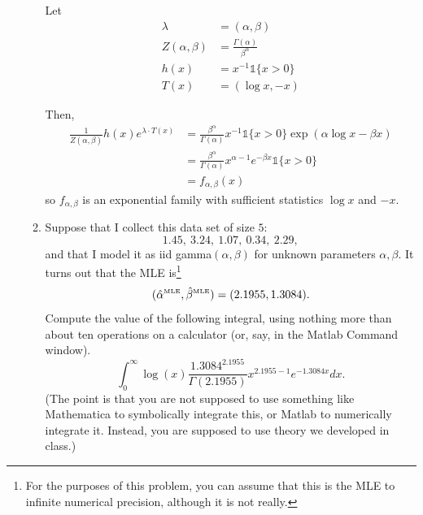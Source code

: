 \documentclass[11pt]{report}
\newcommand{\ind}{{\mathds{1}}}
\begin{document}
\begin{enumerate}[1.]
\begin{enumerate}
                    \color{blue}
                    Let
                    \begin{align*}
                        \lambda          & = (\alpha, \beta)                       \\
                        Z(\alpha, \beta) & = \frac{\Gamma(\alpha)}{\beta^{\alpha}} \\
                        h(x)             & = x^{-1}\ind\{x > 0\}                   \\
                        T(x)             & = (\log x, -x)
                    \end{align*}

                    Then,
                    \begin{align*}
                        \frac{1}{Z(\alpha, \beta)} h(x) e^{\lambda \cdot T(x)} & = \frac{\beta^\alpha}{\Gamma(\alpha)} x^{-1} \ind\{x > 0\} \exp\left(\alpha \log x - \beta x\right) \\
                                                                               & = \frac{\beta^\alpha}{\Gamma(\alpha)} x^{\alpha - 1} e^{-\beta x} \ind\{x > 0\}                     \\
                                                                               & = f_{\alpha, \beta}(x)
                    \end{align*}
                    so $f_{\alpha, \beta}$ is an exponential family with sufficient statistics $\log x$ and $-x$.
                    \color{black}

              \item Suppose that I collect this data set of size $5$:
                    \[ 1.45, \ 3.24, \ 1.07, \ 0.34, \ 2.29,  \]
                    and that I model it as iid gamma$(\alpha,\beta)$ for unknown parameters $\alpha,\beta$. It turns out that the MLE is\footnote{For the purposes of this problem, you can assume that this is the MLE to infinite numerical precision, although it is not really.}
                    \[ (\hat\alpha^\text{\tiny MLE},\hat\beta^\text{\tiny MLE})=(2.1955,1.3084) . \]
                    Compute the value of the following integral, using nothing more than about ten operations on a calculator (or, say, in the Matlab Command window).
                    \[ \int_0^\infty \log(x) \frac{1.3084^{2.1955}}{\Gamma(2.1955)}x^{2.1955-1}e^{-1.3084 x} dx . \]
                    (The point is that you are not supposed to use something like Mathematica to symbolically integrate this, or Matlab to numerically integrate it. Instead, you are supposed to use theory we developed in class.)


\end{enumerate}
\end{enumerate}
\end{document}
